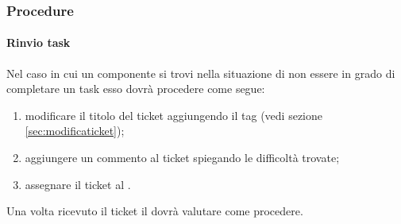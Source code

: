 	\subsubsection{Procedure}
	\paragraph{Rinvio task}\label{sec:rinvioTask}
	Nel caso in cui un componente si trovi nella situazione di non essere in grado di completare un task esso dovrà procedere come segue:
	\begin{enumerate}
		\item modificare il titolo del ticket aggiungendo il tag \cit{[DELAY]} (vedi sezione \ref{sec:modificaticket});
		\item aggiungere un commento al ticket spiegando le difficoltà trovate;
		\item assegnare il ticket al \responsabilediprogetto.
	\end{enumerate}
	Una volta ricevuto il ticket il \responsabilediprogetto{} dovrà valutare come procedere.
	
	



        
